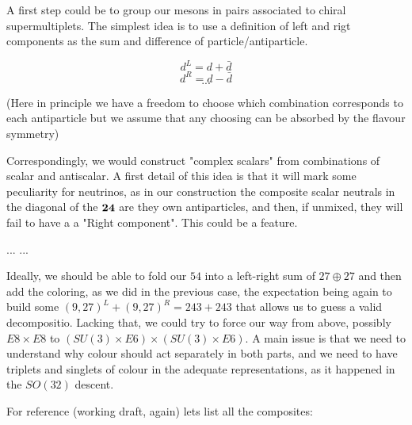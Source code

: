 \documentclass[a4paper]{article}
\begin{document}
A first step could be to group our mesons in pairs associated to
 chiral supermultiplets. The simplest idea is to use a definition
 of left and rigt components as the sum and difference of particle/antiparticle.

$$d^L=d+\bar d$$
$$d^R=d-\bar d $$
$$...$$

(Here in principle we have a freedom to choose which combination
corresponds to each antiparticle but we assume that any choosing can be
absorbed by the flavour symmetry)

Correspondingly, we would construct "complex scalars" from
combinations of scalar and antiscalar. A first detail of this idea is that it will mark some peculiarity for neutrinos,
as in our construction the composite scalar neutrals in the diagonal of the $\bf 24$
are they own antiparticles, and then, if unmixed, they will fail to have a 
a "Right component". This could be a feature.

... ... 

Ideally, we should be able to fold our $54$ into a left-right
sum of $27 \oplus 27$ and then add the coloring, as we did
in the previous case, the expectation being again to build some
$(9,27)^L + (9,27)^R  = 243 + 243$ that allows us to guess
a valid decompositio. Lacking that, we could try to force our way
from above, possibly $E8 \times E8$ to $(SU(3) \times E6)
\times (SU(3) \times E6)$. A main issue is that we need to
understand why colour should act separately in both parts, and
we need to have triplets and singlets of colour in the 
adequate representations, as it happened in the $SO(32)$ descent.


For reference (working draft, again) lets list all the composites:
\end{document}
